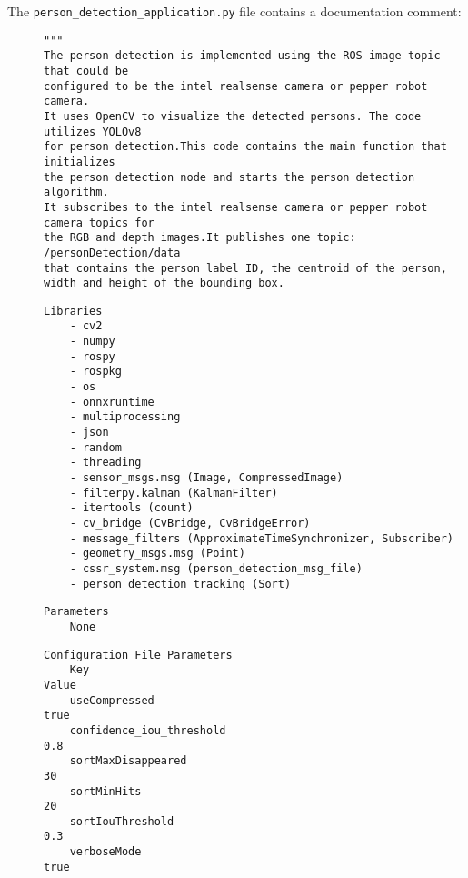 \documentclass{CSSRforAfrica}
\newcommand{\checkboxChecked}{\fbox{\ding{51}}} %
\begin{document}
\noindent The {\small \verb+person_detection_application.py+} file contains a documentation comment:

\begin{description}

\item[\checkboxChecked] 
 {\small 
\begin{verbatim}
"""
The person detection is implemented using the ROS image topic that could be 
configured to be the intel realsense camera or pepper robot camera. 
It uses OpenCV to visualize the detected persons. The code utilizes YOLOv8 
for person detection.This code contains the main function that initializes 
the person detection node and starts the person detection algorithm. 
It subscribes to the intel realsense camera or pepper robot camera topics for 
the RGB and depth images.It publishes one topic: /personDetection/data 
that contains the person label ID, the centroid of the person, 
width and height of the bounding box.
\end{verbatim}}

\item[\checkboxChecked] 
 {\small 
\begin{verbatim}
Libraries
    - cv2
    - numpy
    - rospy
    - rospkg
    - os
    - onnxruntime
    - multiprocessing
    - json
    - random
    - threading
    - sensor_msgs.msg (Image, CompressedImage)
    - filterpy.kalman (KalmanFilter)
    - itertools (count)
    - cv_bridge (CvBridge, CvBridgeError)
    - message_filters (ApproximateTimeSynchronizer, Subscriber)
    - geometry_msgs.msg (Point)
    - cssr_system.msg (person_detection_msg_file)
    - person_detection_tracking (Sort)
\end{verbatim}}

\item[\checkboxChecked] 
 {\small 
\begin{verbatim}
Parameters 
    None
\end{verbatim}}


\item[\checkboxChecked] 
 {\small 
\begin{verbatim}
Configuration File Parameters
    Key                                                         Value
    useCompressed                                               true
    confidence_iou_threshold                                    0.8
    sortMaxDisappeared                                          30
    sortMinHits                                                 20
    sortIouThreshold                                            0.3
    verboseMode                                                 true
\end{verbatim}}


\end{description}
\end{document}
